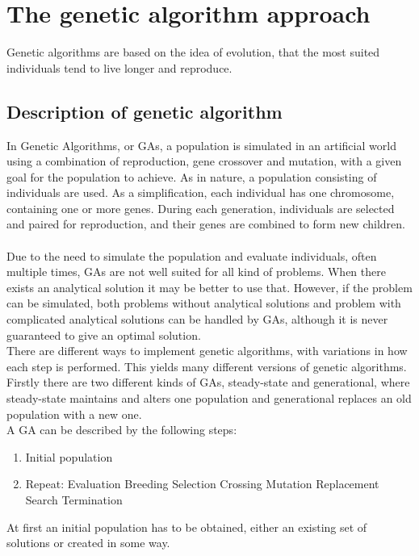 \pagebreak
\section{The genetic algorithm approach}
Genetic algorithms are based on the idea of evolution, that the most suited individuals tend to live longer and reproduce. 
\subsection{Description of genetic algorithm}
In Genetic Algorithms, or GAs, a population is simulated in an artificial world using a combination of reproduction, gene crossover and mutation, with a given goal for the population to achieve. As in nature, a population consisting of individuals are used. As a simplification, each individual has one chromosome, containing one or more genes. During each generation, individuals are selected and paired for reproduction, and their genes are combined to form new children.\\
\\
Due to the need to simulate the population and evaluate individuals, often multiple times, GAs are not well suited for all kind of problems. When there exists an analytical solution it may be better to use that. However, if the problem can be simulated, both problems without analytical solutions and problem with complicated analytical solutions can be handled by GAs, although it is never guaranteed to give an optimal solution.\\
There are different ways to implement genetic algorithms, with variations in how each step is performed. This yields many different versions of genetic algorithms. Firstly there are two different kinds of GAs, steady-state and generational, where steady-state maintains and alters one population and generational replaces an old population with a new one.\\
A GA can be described by the following steps:
\begin{enumerate}
\item Initial population
\item Repeat:
\subitem Evaluation
\subitem Breeding
\subsubitem Selection
\subsubitem Crossing
\subsubitem Mutation
\subsubitem Replacement
\subitem Search Termination
\end{enumerate}
At first an initial population has to be obtained, either an existing set of solutions or created in some way.\\
